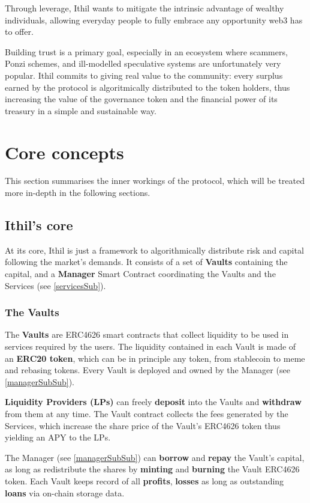\documentclass[a4paper,10 pt]{article}
\theoremstyle{definition}
\begin{document}
Through leverage, Ithil wants to mitigate the intrinsic advantage of wealthy individuals, allowing everyday people to fully embrace any opportunity web3 has to offer.

Building trust is a primary goal, especially in an ecosystem where scammers, Ponzi schemes, and ill-modelled speculative systems are unfortunately very popular. Ithil commits to giving real value to the community: every surplus earned by the protocol is algoritmically distributed to the token holders, thus increasing the value of the governance token and the financial power of its treasury in a simple and sustainable way.

\newpage

\section{Core concepts}
This section summarises the inner workings of the protocol, which will be treated more in-depth in the following sections. 

\subsection{Ithil's core}\label{coreSub}

At its core, Ithil is just a framework to algorithmically distribute risk and capital following the market's demands. It consists of a set of {\bf Vaults} containing the capital, and a {\bf Manager} Smart Contract coordinating the Vaults and the Services (see \ref{servicesSub}).

\subsubsection{The Vaults}\label{vaultSubSub}
The {\bf Vaults} are ERC4626 smart contracts that collect liquidity to be used in services required by the users. The liquidity contained in each Vault is made of an {\bf ERC20 token}, which can be in principle any token, from stablecoin to meme and rebasing tokens. 
Every Vault is deployed and owned by the Manager (see \ref{managerSubSub}).

{\bf Liquidity Providers (LPs)} can freely {\bf deposit} into the Vaults and {\bf withdraw} from them at any time. The Vault contract collects the fees generated by the Services, which increase the share price of the Vault's ERC4626 token thus yielding an APY to the LPs.

The Manager (see \ref{managerSubSub}) can {\bf borrow} and {\bf repay} the Vault's capital, as long as redistribute the shares by {\bf minting} and {\bf burning} the Vault ERC4626 token. Each Vault keeps record of all {\bf profits}, {\bf losses} as long as outstanding {\bf loans} via on-chain storage data.
\end{document}
